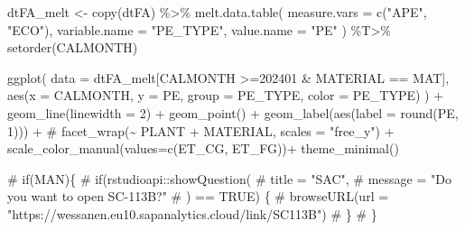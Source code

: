 \documentclass[
  american,
  10,
  a4paper,
]{book}
\newenvironment{Shaded}{\begin{snugshade}}{\end{snugshade}}
\newcommand{\AttributeTok}[1]{\textcolor[rgb]{0.40,0.45,0.13}{#1}}
\newcommand{\CommentTok}[1]{\textcolor[rgb]{0.37,0.37,0.37}{#1}}
\newcommand{\DecValTok}[1]{\textcolor[rgb]{0.68,0.00,0.00}{#1}}
\newcommand{\FunctionTok}[1]{\textcolor[rgb]{0.28,0.35,0.67}{#1}}
\newcommand{\NormalTok}[1]{\textcolor[rgb]{0.00,0.23,0.31}{#1}}
\newcommand{\OtherTok}[1]{\textcolor[rgb]{0.00,0.23,0.31}{#1}}
\newcommand{\SpecialCharTok}[1]{\textcolor[rgb]{0.37,0.37,0.37}{#1}}
\newcommand{\StringTok}[1]{\textcolor[rgb]{0.13,0.47,0.30}{#1}}
\theoremstyle{definition}
\theoremstyle{remark}
\begin{document}
\begin{Shaded}
\begin{Highlighting}[]
\NormalTok{dtFA\_melt  }\OtherTok{\textless{}{-}} 
  \FunctionTok{copy}\NormalTok{(dtFA) }\SpecialCharTok{\%\textgreater{}\%}
  \FunctionTok{melt.data.table}\NormalTok{(}
    \AttributeTok{measure.vars  =} \FunctionTok{c}\NormalTok{(}\StringTok{"APE"}\NormalTok{, }\StringTok{"ECO"}\NormalTok{),}
    \AttributeTok{variable.name =} \StringTok{"PE\_TYPE"}\NormalTok{,}
    \AttributeTok{value.name    =} \StringTok{"PE"}
\NormalTok{    ) }\SpecialCharTok{\%T\textgreater{}\%} \FunctionTok{setorder}\NormalTok{(CALMONTH)}

\FunctionTok{ggplot}\NormalTok{(}
  \AttributeTok{data =}\NormalTok{ dtFA\_melt[CALMONTH }\SpecialCharTok{\textgreater{}=}\StringTok{\textquotesingle{}202401\textquotesingle{}} \SpecialCharTok{\&}\NormalTok{ MATERIAL }\SpecialCharTok{==}\NormalTok{ MAT], }
  \FunctionTok{aes}\NormalTok{(}\AttributeTok{x =}\NormalTok{ CALMONTH, }\AttributeTok{y =}\NormalTok{ PE, }\AttributeTok{group =}\NormalTok{ PE\_TYPE, }\AttributeTok{color =}\NormalTok{ PE\_TYPE)}
\NormalTok{  ) }\SpecialCharTok{+}
  \FunctionTok{geom\_line}\NormalTok{(}\AttributeTok{linewidth =} \DecValTok{2}\NormalTok{) }\SpecialCharTok{+}
  \FunctionTok{geom\_point}\NormalTok{() }\SpecialCharTok{+}
  \FunctionTok{geom\_label}\NormalTok{(}\FunctionTok{aes}\NormalTok{(}\AttributeTok{label =} \FunctionTok{round}\NormalTok{(PE, }\DecValTok{1}\NormalTok{))) }\SpecialCharTok{+}
  \CommentTok{\# facet\_wrap(\textasciitilde{} PLANT + MATERIAL, scales = "free\_y") +}
  \FunctionTok{scale\_color\_manual}\NormalTok{(}\AttributeTok{values=}\FunctionTok{c}\NormalTok{(ET\_CG, ET\_FG))}\SpecialCharTok{+}
  \FunctionTok{theme\_minimal}\NormalTok{()}

\CommentTok{\# if(MAN)\{}
\CommentTok{\#   if(rstudioapi::showQuestion(}
\CommentTok{\#     title   = "SAC", }
\CommentTok{\#     message = "Do you want to open SC{-}113B?"}
\CommentTok{\#   ) == TRUE) \{}
\CommentTok{\#     browseURL(url = "https://wessanen.eu10.sapanalytics.cloud/link/SC113B")}
\CommentTok{\#   \}}
\CommentTok{\# \}}
\end{Highlighting}
\end{Shaded}
\end{document}
